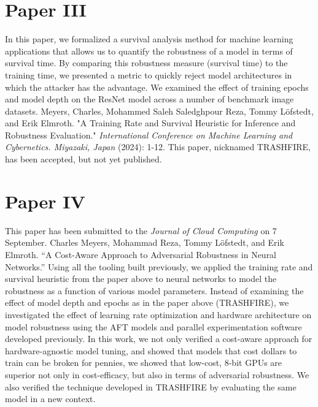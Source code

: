 \section{Paper III}
In this paper, we formalized a survival analysis method for machine learning applications that allows us to quantify the robustness of a model in terms of survival time. By comparing this robustness measure (survival time) to the training time, we presented a metric to quickly reject model architectures in which the attacker has the advantage. We examined the effect of training epochs and model depth on the ResNet model across a number of benchmark image datasets. Meyers, Charles, Mohammed Saleh Saledghpour Reza, Tommy Löfstedt, and Erik Elmroth. "A Training Rate and Survival Heuristic for Inference and Robustness Evaluation." {\em International Conference on Machine Learning and Cybernetics. Miyazaki, Japan} (2024): 1-12. This paper, nicknamed TRASHFIRE, has been accepted, but not yet published.


\section{Paper IV}
This paper has been submitted to the \textit{Journal of Cloud Computing} on 7 September.
Charles Meyers, Mohammad Reza, Tommy Löfstedt, and Erik Elmroth. “A Cost-Aware Approach to Adversarial Robustness in Neural Networks.”
Using all the tooling built previously, we applied the training rate and survival heuristic from the paper above to neural networks to model the robustness as a function of various model parameters. Instead of examining the effect of model depth and epochs as in the paper above (TRASHFIRE), we investigated the effect of learning rate optimization and hardware architecture on model robustness using the AFT models and parallel experimentation software developed previously. In this work, we not only verified a cost-aware approach for hardware-agnostic model tuning, and showed that models that cost dollars to train can be broken for pennies, we showed that low-cost, 8-bit GPUs are superior not only in cost-efficacy, but also in terms of adversarial robustness. We also verified the technique developed in TRASHFIRE by evaluating the same model in a new context.

